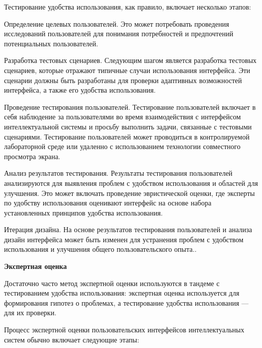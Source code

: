 Тестирование удобства использования, как правило, включает несколько этапов:

\begin{textitemize}
	\item Определение целевых пользователей. Это может потребовать проведения исследований пользователей для понимания потребностей и предпочтений потенциальных пользователей.
	\item Разработка тестовых сценариев. Следующим шагом является разработка тестовых сценариев, которые отражают типичные случаи использования интерфейса. Эти сценарии должны быть разработаны для проверки адаптивных возможностей интерфейса, а также его удобства использования.
	\item Проведение тестирования пользователей. Тестирование пользователей включает в себя наблюдение за пользователями во время взаимодействия с интерфейсом интеллектуальной системы и просьбу выполнить задачи, связанные с тестовыми сценариями. Тестирование пользователей может проводиться в контролируемой лабораторной среде или удаленно с использованием технологии совместного просмотра экрана.
	\item Анализ результатов тестирования. Результаты тестирования пользователей анализируются для выявления проблем с удобством использования и областей для улучшения. Это может включать проведение эвристической оценки, где эксперты по удобству использования оценивают интерфейс на основе набора установленных принципов удобства использования.
	\item Итерация дизайна. На основе результатов тестирования пользователей и анализа дизайн интерфейса может быть изменен для устранения проблем с удобством использования и улучшения общего пользовательского опыта..
\end{textitemize}

\textbf{Экспертная оценка} 

Достаточно часто метод экспертной оценки используются в тандеме с тестированием удобства использования: экспертная оценка используется для формирования гипотез о проблемах, а тестирование удобства использования — для их проверки.

Процесс экспертной оценки пользовательских интерфейсов интеллектуальных систем обычно включает следующие этапы:

